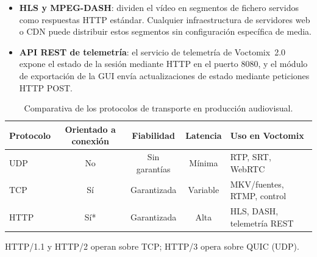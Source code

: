 \begin{itemize}
  \item \textbf{HLS y MPEG-DASH}: dividen el vídeo en segmentos de fichero servidos
        como respuestas HTTP estándar. Cualquier infraestructura de servidores web
        o CDN puede distribuir estos segmentos sin configuración específica de media.
  \item \textbf{API REST de telemetría}: el servicio de telemetría de Voctomix~2.0
        expone el estado de la sesión mediante HTTP en el puerto 8080, y el módulo
        de exportación de la GUI envía actualizaciones de estado mediante
        peticiones HTTP POST.
\end{itemize}

\begin{table}[H]
  \centering
  \caption{Comparativa de los protocolos de transporte en producción audiovisual.}
  \label{tab:protocolos_red}
  \small
  \begin{tabularx}{\linewidth}{|l|c|c|c|X|}
    \hline
    \textbf{Protocolo} & \textbf{Orientado a conexión} & \textbf{Fiabilidad} & \textbf{Latencia} & \textbf{Uso en Voctomix} \\
    \hline
    UDP  & No  & Sin garantías & Mínima       & RTP, SRT, WebRTC \\
    TCP  & Sí  & Garantizada   & Variable     & MKV/fuentes, RTMP, control \\
    HTTP & Sí* & Garantizada   & Alta         & HLS, DASH, telemetría REST \\
    \hline
  \end{tabularx}
  \begin{flushleft}
    \footnotesize *HTTP/1.1 y HTTP/2 operan sobre TCP; HTTP/3 opera sobre QUIC (UDP).
  \end{flushleft}
\end{table}
